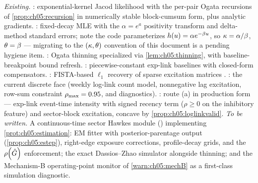 \begin{codehooks}
\emph{Existing.} : exponential-kernel
Jacod likelihood with the per-pair Ogata recursions of
\cref{prop:ch05:recursion} in numerically stable block-cumsum form, plus
analytic gradients. : fixed-decay MLE with
the $\alpha = e^{a}$ positivity transform and delta-method standard
errors; note the code parameterizes $h(u) = \alpha e^{-\beta u}$,
so $\kappa = \alpha/\beta$, $\theta = \beta$ --- migrating to the
$(\kappa,\theta)$ convention of this document is a pending hygiene item.
: Ogata thinning specialized via
\cref{lem:ch05:thinning}, with baseline-breakpoint bound refresh.
: piecewise-constant exp-link baselines
with closed-form compensators. :
FISTA-based $\ell_1$ recovery of sparse excitation matrices
\citep{hansen2015}. : the current discrete
face (weekly log-link count model, nonnegative lag excitation, row-sum
constraint $\rho_{\max}=0.95$,  and
 diagnostics).
: route (a) in production form
--- exp-link event-time intensity with signed recency term ($\rho \ge 0$
on the inhibitory feature) and sector-block excitation, concave by
\cref{prop:ch05:loglinkvalid}.
\emph{To be written.} A continuous-time sector Hawkes module
() implementing
\cref{prot:ch05:estimation}: EM fitter with posterior-parentage output
(\cref{prop:ch05:estep}), right-edge exposure corrections, profile-decay
grids, and the $\rho\!\left(\hat{G}\right)$ enforcement; the exact
Dassios--Zhao simulator \citep{dassioszhao2013} alongside thinning; and
the Mechanism-B operating-point monitor of \cref{warn:ch05:mechB} as a
first-class simulation diagnostic.
\end{codehooks}
